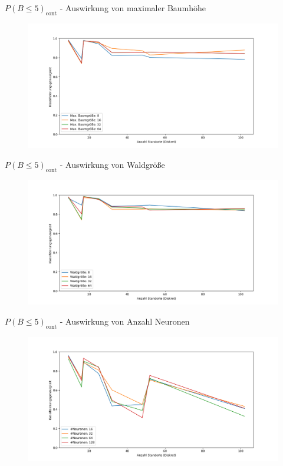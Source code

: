 \documentclass[10pt]{beamer}
\begin{document}
\begin{frame}{$P(B\leq5)_{\text{cont}}$ - Auswirkung von maximaler Baumhöhe}
    \begin{figure}
        \centering
        \includegraphics[width=\linewidth]{location_recognition/multiple_best_by_group_dt_max_depth_acc_5_cont.png}
    \end{figure}
\end{frame}

\begin{frame}{$P(B\leq5)_{\text{cont}}$ - Auswirkung von Waldgröße}
    \begin{figure}
        \centering
        \includegraphics[width=\linewidth]{location_recognition/multiple_best_by_group_dt_trees_acc_5_cont.png}
    \end{figure}
\end{frame}

\begin{frame}{$P(B\leq5)_{\text{cont}}$ - Auswirkung von Anzahl Neuronen}
    \begin{figure}
        \centering
        \includegraphics[width=\linewidth]{location_recognition/multiple_best_by_group_knn_neurons_acc_5_cont.png}
    \end{figure}
\end{frame}
\end{document}
